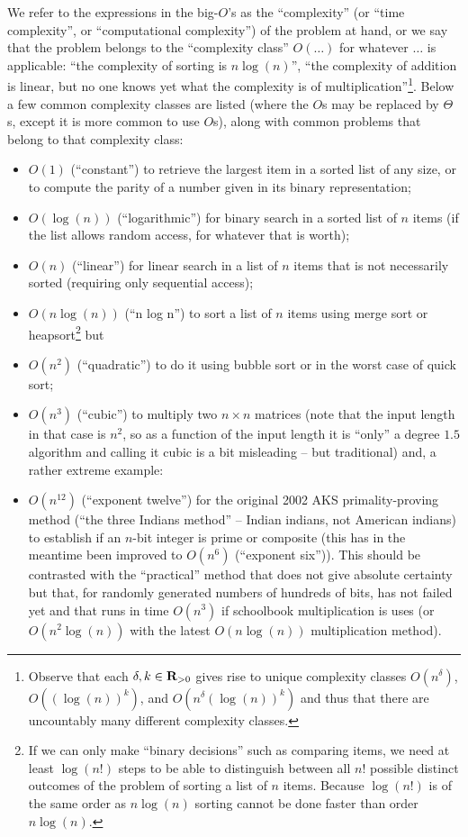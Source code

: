 \documentclass[titlepage]{article}
\theoremstyle{definition}
\numberwithin{equation}{subsection}
\numberwithin{remark}{subsection}
\begin{document}
We refer to the expressions in the big-$O$'s as the ``complexity'' (or ``time complexity'', or ``computational complexity'') of the problem at hand, or we say that the problem belongs to the ``complexity class'' $O(\ldots)$ for whatever $\ldots$ is applicable:
``the complexity of sorting is $n\log(n)$'', ``the complexity of addition is linear, but no one knows yet what the complexity is of multiplication''\footnote{Observe that each $\delta,k\in{\bf R}_{>0}$ gives rise to unique complexity classes $O(n^\delta)$, $O((\log(n))^k)$, and $O(n^\delta(\log(n))^k)$ and thus that there are uncountably many different complexity classes.}. Below a few common complexity classes are listed (where the $O$s may be replaced by $\Theta$s, except it is more common to use $O$s), along with common problems that belong to that complexity class:
\begin{itemize}
\item $O(1)$ (``constant'') to retrieve the largest item in a sorted list of any size, or to compute the parity of a number given in its binary representation;
\item $O(\log(n))$ (``logarithmic'') for binary search in a sorted list of $n$ items (if the list allows random access, for whatever that is worth);
\item $O(n)$ (``linear'') for linear search in a list of $n$ items that is not necessarily sorted (requiring only sequential access);
\item $O(n\log(n))$ (``n log n'') to sort a list of $n$ items using merge sort or heapsort\footnote{If we can only make ``binary decisions'' such as comparing items, we need at least $\log(n!)$ steps to be able to distinguish between all $n!$ possible distinct outcomes of the problem of sorting a list of $n$ items. Because $\log(n!)$ is of the same order as $n\log(n)$ sorting cannot be done faster than order $n\log(n)$.} but
\item $O(n^2)$ (``quadratic'') to do it using bubble sort or in the worst case of quick sort;
\item $O(n^3)$ (``cubic'') to multiply two $n\times n$ matrices (note that the input length in that case is $n^2$, so as a function of the input length it is ``only'' a degree $1.5$ algorithm and calling it cubic is a  bit misleading -- but traditional) and, a rather extreme example:
\item $O(n^{12})$ (``exponent twelve'') for the original 2002 AKS primality-proving method (``the three Indians method'' -- Indian indians, not American indians) to establish if an $n$-bit integer is prime or composite (this has in the meantime been improved to $O(n^6)$ (``exponent six'')). This should be contrasted with the ``practical'' method that does not give absolute certainty but that, for randomly generated numbers of hundreds of bits, has not failed yet and that runs in time $O(n^3)$ if schoolbook multiplication is uses (or $O(n^2\log(n))$ with the latest $O(n\log(n))$ multiplication method). 
\end{itemize}
\end{document}
